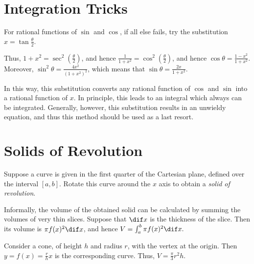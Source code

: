 \documentclass[11pt]{scrartcl}
\begin{document}
\section{Integration Tricks}

For rational functions of $\sin$ and $\cos$, if all else fails, try the substitution $x = \tan \frac{\theta}{2}$.

Thus, $1+x^2 = \sec^2(\frac{\theta}{2})$, and hence $\frac{1}{1+x^2} = \cos^2(\frac{\theta}{2})$, and hence $\cos \theta = \frac{1-x^2}{1+x^2}$. Moreover, $\sin^2 \theta = \frac{4x^2}{(1+x^2)^2}$, which means that $\sin \theta = \frac{2x}{1+x^2}$.

In this way, this substitution converts any rational function of
$\cos$ and $\sin$ into a rational function of $x$. In principle, this
leads to an integral which always can be integrated. Generally,
however, this substitution results in an unwieldy equation, and thus
this method should be used as a last resort.

\section{Solids of Revolution}

Suppose a curve is given in the first quarter of the Cartesian
plane, defined over the interval $[a, b]$. Rotate this curve around the $x$ axis to obtain a \textit{solid of revolution}.

Informally, the volume of the obtained solid can be calculated by
summing the volumes of very thin slices. Suppose that $\dif x$ is the
thickness of the slice. Then its volume is $\pi f(x)^2 \dif x$, and
hence $V = \int_a^b \pi f(x)^2 \dif x.$

Consider a cone, of height $h$ and radius $r$, with the vertex at the
origin. Then $y=f(x) = \frac{r}{h} x$ is the corresponding
curve. Thus, $V = \frac{\pi}{3}r^2h$.
\end{document}
